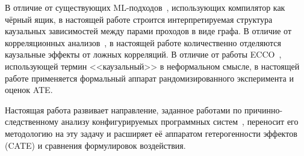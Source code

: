 В отличие от существующих ML-подходов~\cite{kulkarni2012mitigating, hajali2020phd, liang2023learning, trofin2021mlgo}, использующих компилятор как чёрный ящик, в настоящей работе строится интерпретируемая структура каузальных зависимостей между парами проходов в виде графа. В отличие от корреляционных анализов~\cite{hajali2020phd}, в настоящей работе количественно отделяются каузальные эффекты от ложных корреляций. В отличие от работы ECCO~\cite{pan2026ecco}, использующей термин <<каузальный>> в неформальном смысле, в настоящей работе применяется формальный аппарат рандомизированного эксперимента и оценок ATE.

Настоящая работа развивает направление, заданное работами по причинно-следственному анализу конфигурируемых программных систем~\cite{iqbal2022unicorn, dubslaff2022causality, johnson2020causal}, переносит его методологию на эту задачу и расширяет её аппаратом гетерогенности эффектов (CATE) и сравнения формулировок воздействия.

\newpage
